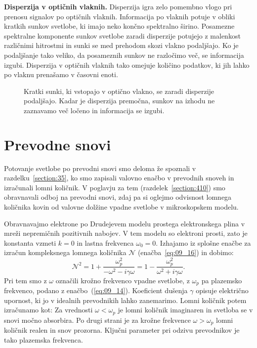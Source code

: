 \begin{example}{\bf Disperzija v optičnih vlaknih.}
Disperzija igra zelo pomembno vlogo pri prenosu signalov
po optičnih vlaknih. Informacija po vlaknih potuje
v obliki kratkih sunkov svetlobe, ki imajo neko
končno spektralno širino. Posamezne spektralne 
komponente sunkov svetlobe zaradi disperzije 
potujejo z malenkost različnimi hitrostmi in sunki se 
med prehodom skozi vlakno podaljšajo. Ko je podaljšanje
tako veliko, da posameznih sunkov ne razločimo več, 
se informacija izgubi.  
Disperzija v optičnih vlaknih tako omejuje količino 
podatkov, ki jih lahko po vlaknu prenašamo v časovni enoti.
\begin{figure}[ht]
\centering
\def\svgwidth{130truemm} 

\caption{Kratki sunki, ki vstopajo v optično vlakno, se zaradi 
disperzije podaljšajo. Kadar je disperzija premočna, sunkov
na izhodu ne zaznavamo več ločeno in informacija se izgubi.}
\label{fig:09_disperzijafib}
\end{figure}

\end{example}

\section{Prevodne snovi}
Potovanje svetlobe po prevodni snovi smo deloma že spoznali v 
razdelku~\ref{section:35}, ko smo zapisali valovno enačbo 
v prevodnih snoveh in izračunali lomni količnik.
V  poglavju za tem (razdelek~\ref{section:410}) 
smo obravnavali odboj na prevodni snovi, zdaj pa si oglejmo odvisnost
lomnega količnika kovin od valovne dolžine vpadne svetlobe v mikroskopskem
modelu.

Obravnavajmo elektrone po Drudejevem modelu prostega elektronskega plina
v mreži nepremičnih pozitivnih nabojev. V tem modelu so elektroni prosti,
zato je konstanta vzmeti $k=0$ in lastna frekvenca $\omega_0=0$. Izhajamo 
iz splošne enačbe za izračun kompleksnega lomnega količnika $\mathcal{N}$
(enačba~\ref{eq:09_16}) in dobimo:
\begin{equation}
\mathcal{N}^2 = 1 + \frac{\omega_p^2}{-\omega^2 -i \gamma \omega} = 1- 
\frac{\omega_p^2}{\omega^2+i\gamma \omega}.
\label{eq:09_36}
\end{equation}
Pri tem smo z $\omega$ označili krožno frekvenco vpadne svetlobe, z
$\omega_p$ pa plazemsko frekvenco, podano z enačbo~(\ref{eq:09_14}). 
Koeficient dušenja $\gamma$ opisuje električno upornost, ki jo v idealnih 
prevodnikih lahko zanemarimo. Lomni količnik potem izračunamo kot:
Za vrednosti $\omega < \omega_p$ je lomni količnik imaginaren in svetloba se v snovi
močno absorbira. Po drugi strani je za krožne frekvence $\omega > \omega_p$ lomni količnik realen 
in snov prozorna. Ključni parameter pri odzivu prevodnikov je tako plazemska frekvenca. 

